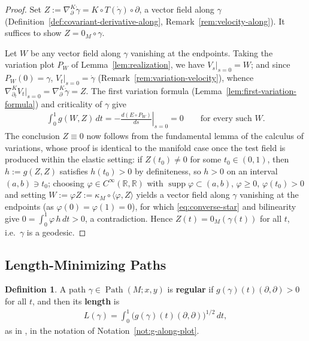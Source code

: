 \documentclass{amsart}
\newcommand{\R}{\mathbb{R}}
\DeclareMathOperator{\Path}{Path}
\theoremstyle{definition}
\newtheorem{defn}[thm]{Definition}
\begin{document}
\begin{proof}
  Set $Z := \nabla^{K}_\partial \dot\gamma = K \circ T(\dot\gamma) \circ \partial$,
  a vector field along $\gamma$ (Definition~\ref{def:covariant-derivative-along},
  Remark~\ref{rem:velocity-along}). It suffices to show $Z = 0_M \circ \gamma$.

  Let $W$ be any vector field along $\gamma$ vanishing at the endpoints. Taking
  the variation plot $P_W$ of Lemma~\ref{lem:realization}, we have
  $V_s|_{s=0} = W$; and since $P_W(0) = \gamma$,
  $V_t|_{s=0} = \dot\gamma$ (Remark~\ref{rem:variation-velocity}), whence
  $\nabla^{K}_{\partial_t} V_t|_{s=0} = \nabla^{K}_\partial \dot\gamma = Z$.
  The first variation formula (Lemma~\ref{lem:first-variation-formula}) and
  criticality of $\gamma$ give
  \begin{align}\label{eq:converse-star}
    \int_0^1 g(W, Z)\, dt
      = - \left. \frac{d(E \circ P_W)}{ds} \right|_{s=0}
      = 0
    \qquad \text{for every such } W.
  \end{align}
  The conclusion $Z \equiv 0$ now follows from the fundamental lemma of the
  calculus of variations, whose proof is identical to the manifold case once
  the test field is produced within the elastic setting: if $Z(t_0) \ne 0$ for
  some $t_0 \in (0,1)$, then $h := g(Z, Z)$ satisfies $h(t_0) > 0$ by
  definiteness, so $h > 0$ on an interval $(a,b) \ni t_0$; choosing
  $\varphi \in C^\infty(\R,\R)$ with $\operatorname{supp}\varphi \subset (a,b)$,
  $\varphi \ge 0$, $\varphi(t_0) > 0$ and setting $W := \varphi Z := \kappa_M
  \circ \langle \varphi, Z\rangle$ yields a vector field along $\gamma$
  vanishing at the endpoints (as $\varphi(0) = \varphi(1) = 0$), for which
  \eqref{eq:converse-star} and bilinearity give
  $0 = \int_0^1 \varphi\, h \, dt > 0$, a contradiction. Hence $Z(t) = 0_M(\gamma(t))$
  for all $t$, i.e.\ $\gamma$ is a geodesic.
\end{proof}

\subsection{Length-Minimizing Paths}\label{subsec:length}

\begin{defn}\label{def:length}
  A path $\gamma \in \Path(M; x, y)$ is \textbf{regular} if
  $g(\gamma)(t)(\partial, \partial) > 0$ for all $t$, and then its
  \textbf{length} is
  \begin{align*}
    L(\gamma)
      = \int_0^1 \bigl( g(\gamma)(t)(\partial, \partial) \bigr)^{1/2}\, dt,
  \end{align*}
  as in \cite{KSS}, in the notation of Notation~\ref{not:g-along-plot}.
\end{defn}
\end{document}

